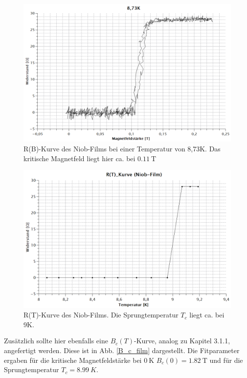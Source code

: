  \begin{figure}[H]
 	\begin{center}
 		\includegraphics[width=13cm]{8,73_Film.png}
 		\caption{R(B)-Kurve des Niob-Films bei einer Temperatur von 8,73K. Das kritische Magnetfeld liegt hier ca. bei $\SI{0,11}{\tesla}$}
 		\label{8,73_film}
 	\end{center}
 \end{figure}

\begin{figure}[H]
	\begin{center}
		\includegraphics[width=13cm]{R(T).png}
		\caption{R(T)-Kurve des Niob-Films. Die Sprungtemperatur $T_{c}$ liegt ca. bei 9K.}
		\label{R(T)}
	\end{center}
\end{figure}

Zusätzlich sollte hier ebenfalls eine $B_{c}(T)$-Kurve, analog zu Kapitel 3.1.1,  angefertigt werden. Diese ist in Abb. \ref{B_c_film} dargestellt. Die Fitparameter ergaben für die kritische Magnetfeldstärke bei $\SI{0}{\kelvin}$ $B_{c}(0)=\SI{1,82}{\tesla}$ und für die Sprungtemperatur $T_{c}=\SI{8,99}{K}$.


